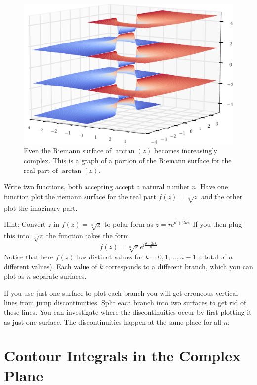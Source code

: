 \begin{figure}
\includegraphics[width=\textwidth]{arctan_riemann_surface}
\caption{Even the Riemann surface of $\arctan(z)$ becomes increasingly complex.
This is a graph of a portion of the Riemann surface for the real part of $\arctan(z)$.}
\label{fig:arctan_riemann_surface}
\end{figure}

\begin{problem}
Write two functions, both accepting accept a natural number $n$.
Have one function plot the riemann surface for the real part $f(z)=\sqrt[n]{z}$ and the other plot the imaginary part.

Hint: Convert $z$ in $f(z)=\sqrt[n]{z}$ to polar form as $z=re^{\theta + 2k\pi}$
If you then plug this into $\sqrt[n]{z}$ the function takes the form
\[f(z)=\sqrt[n]{r} e^{i \frac{\theta + 2 \pi k}{n}}\]
Notice that here $f(z)$ has distinct values for $k = 0, 1, \dots, n-1$ a total of $n$ different values). Each value of $k$ corresponds to a different branch, which you can plot as $n$ separate surfaces.

If you use just one surface to plot each branch you will get erroneous vertical lines from jump discontinuities. Split each branch into two surfaces to get rid of these lines. You can investigate where the discontinuities occur by first plotting it as just one surface. The discontinuities happen at the same place for all $n$;
\end{problem}

\section*{Contour Integrals in the Complex Plane}

